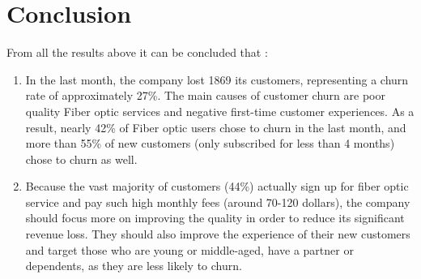 \section{Conclusion}
From all the results above it can be concluded that :
\begin{enumerate}
	\item In the last month, the company lost 1869 its customers, representing a churn rate of approximately 27\%. The main causes of customer churn are poor quality Fiber optic services and negative first-time customer experiences. As a result, nearly 42\% of Fiber optic users chose to churn in the last month, and more than 55\% of new customers (only subscribed for less than 4 months) chose to churn as well.
	\item Because the vast majority of customers (44\%) actually sign up for fiber optic service and pay such high monthly fees (around 70-120 dollars), the company should focus more on improving the quality in order to reduce its significant revenue loss. They should also improve the experience of their new customers and target those who are young or middle-aged, have a partner or dependents, as they are less likely to churn.
\end{enumerate}